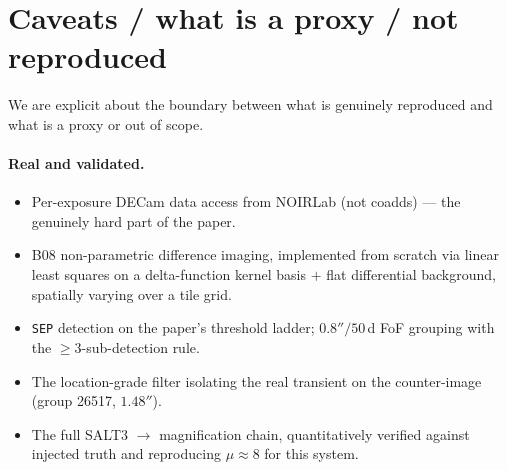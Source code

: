 \documentclass[11pt,letterpaper]{article}
\newcommand{\muamp}{\ensuremath{\mu}}
\begin{document}
\section{Caveats / what is a proxy / not reproduced}
\label{sec:caveats}

We are explicit about the boundary between what is genuinely reproduced and
what is a proxy or out of scope.

\paragraph{Real and validated.}
\begin{itemize}
\item Per-exposure DECam data access from NOIRLab (not coadds) --- the
      genuinely hard part of the paper.
\item B08 \autocite{bramich2008} non-parametric difference imaging,
      implemented from scratch via linear least squares on a delta-function
      kernel basis $+$ flat differential background, spatially varying over a
      tile grid.
\item \texttt{SEP} detection on the paper's threshold ladder; $0.8''/50$\,d
      FoF grouping with the $\geq3$-sub-detection rule.
\item The location-grade filter isolating the real transient on the
      counter-image (group 26517, $1.48''$).
\item The full SALT3 $\to$ magnification chain, quantitatively verified
      against injected truth and reproducing $\muamp\approx8$ for this
      system.
\end{itemize}
\end{document}
